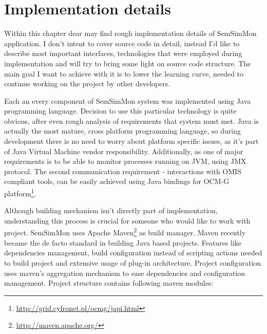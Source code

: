  
%


\chapter{Implementation details}
\label{cha:implementation}

Within this chapter dear may find rough implementation details of SemSimMon application. I don't intent to cover
source code in detail, instead I'd like to describe most important interfaces, technologies  that were
employed during implementation and will try to bring some light on source code structure. The main goal I want to
achieve with it is to lower the learning curve, needed to continue working on the project by other developers.

Each an every component of SemSimMon system was implemented using Java programming language. Decision to use this
particular technology is quite obvious, after even rough analysis of requirements that system must met. Java is
actually the most mature, cross platform programming language, so during development there is no need to worry about
platform specific issues, as it's part of Java Virtual Machine vendor responsibility. Additionally, as one of major
requirements is to be able to monitor processes running on JVM, using JMX protocol. The second communication
requirement - interactions with OMIS compliant tools, can be easily achieved using Java bindings for OCM-G
platform\footnote{\url{http://grid.cyfronet.pl/ocmg/japi.html}}.  

Although building mechanism isn't directly part of implementation, understanding this process is crucial for someone
who would like to work with project. SemSimMon uses Apache Maven\footnote{\url{http://maven.apache.org/}} as build
manager. Maven recently became the de facto standard in building Java based projects. Features like dependencies
management, build configuration instead of scripting actions needed to build project and extensive usage of plug-in
architecture. Project configuration uses maven's aggregation mechanism to ease dependencies and configuration
management. Project structure contains following maven modules:

